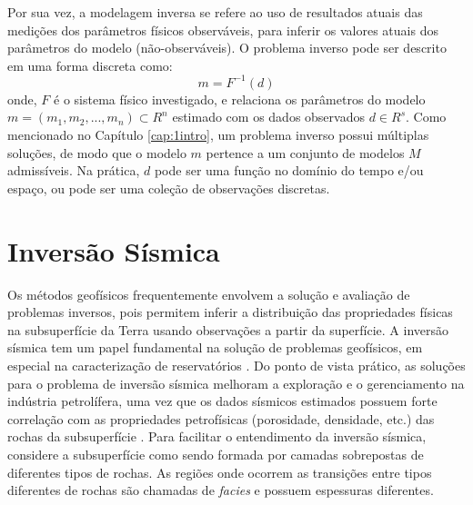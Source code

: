 Por sua vez, a modelagem inversa se refere ao uso de resultados atuais das medições dos parâmetros
físicos observáveis, para inferir os valores atuais dos parâmetros do modelo (não-observáveis).
O problema inverso pode ser descrito em uma forma discreta como:
\begin{equation}
\label{eq:deqgm}
m = F^{-1}(d)
\end{equation}
onde, $F$ é o sistema físico investigado, e relaciona os parâmetros do modelo $m=(m_1, m_2,...,m_n) \subset R^n$
estimado com os dados observados $d \in R^s$.
Como mencionado no Capítulo \ref{cap:1intro}, um problema inverso possui múltiplas soluções,
de modo que o modelo $m$ pertence a um conjunto de modelos $M$ admissíveis.
Na prática, $d$ pode ser uma função no domínio do tempo e/ou espaço, ou pode ser
uma coleção de observações discretas.

\section{Inversão Sísmica}
Os métodos geofísicos frequentemente envolvem a solução e avaliação de problemas inversos,
pois permitem inferir a distribuição das propriedades físicas na subsuperfície da Terra
usando observações a partir da superfície. A inversão sísmica tem um papel fundamental na solução 
de problemas geofísicos, em especial na caracterização de reservatórios \citep{Bosch2010,Srivastava2009}.
Do ponto de vista prático, as soluções para o problema de inversão sísmica melhoram a exploração e
o gerenciamento na indústria petrolífera, uma vez que os dados sísmicos estimados possuem forte correlação com as
propriedades petrofísicas (porosidade, densidade, etc.) das rochas da subsuperfície \citep{Figueiredo2014}.
Para facilitar o entendimento da inversão sísmica, considere a subsuperfície como sendo formada por camadas
sobrepostas de diferentes tipos de rochas. As regiões onde ocorrem as transições entre tipos
diferentes de rochas são chamadas de \textit{facies} e possuem espessuras diferentes.

